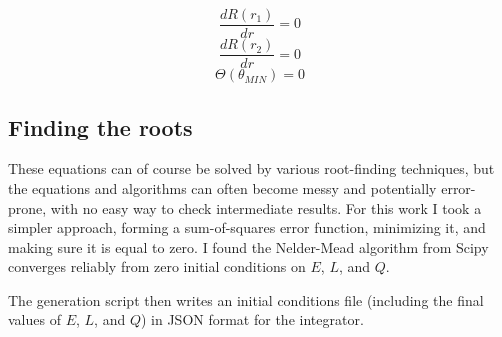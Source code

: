 \documentclass[11pt]{article}
\begin{document}
$$
\frac{d R(r_1)}{d r} = 0
$$
$$
\frac{d R(r_2)}{d r} = 0
$$
$$
\Theta(\theta_{MIN}) = 0
$$

\subsection{Finding the roots}

These equations can of course be solved by various root-finding techniques, but the equations and algorithms can often become messy and potentially error-prone, with no easy way to check intermediate results.  For this work I took a simpler approach, forming a sum-of-squares error function, minimizing it, and making sure it is equal to zero.  I found the Nelder-Mead algorithm from Scipy converges reliably from zero initial conditions on $E$, $L$, and $Q$.

The generation script then writes an initial conditions file (including the final values of $E$, $L$, and $Q$) in JSON format for the integrator.
\end{document}
